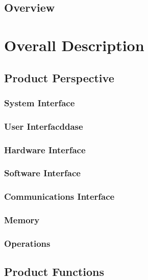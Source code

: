 \documentclass[12pt]{article}
\begin{document}
{        \subsection{Overview}
			


\pagebreak
	\section{Overall Description}


        \subsection{Product Perspective}


        	\subsubsection{System Interface}


            \subsubsection{User Interfacddase}



            \subsubsection{Hardware Interface}
		

            \subsubsection{Software Interface}


            \subsubsection{Communications Interface}


            \subsubsection{Memory}
		

            \subsubsection{Operations}


		\subsection{Product Functions}


}
\end{document}
